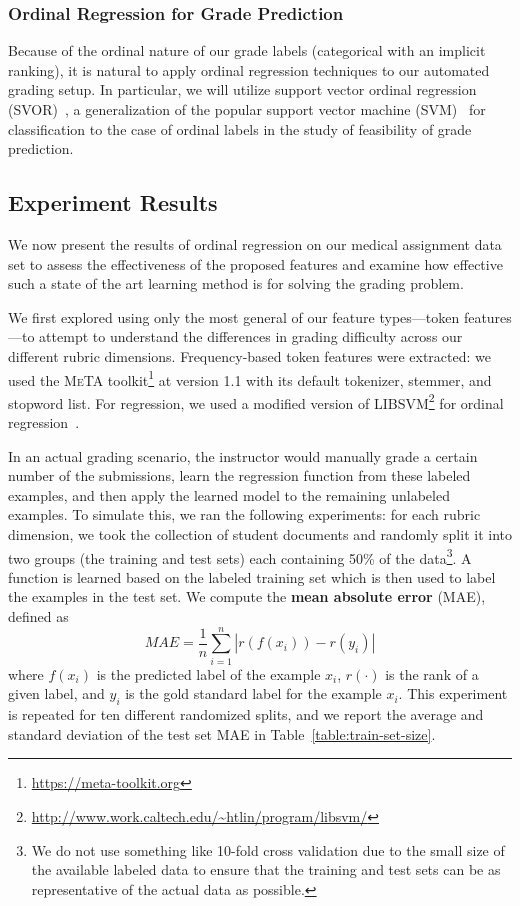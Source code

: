 \subsubsection{Ordinal Regression for Grade Prediction}

Because of the ordinal nature of our grade labels (categorical with an
implicit ranking), it is natural to apply ordinal regression techniques to
our automated grading setup. In particular, we will utilize support vector
ordinal regression (SVOR)~\cite{Chu:2007:SVOR}, a generalization of the
popular support vector machine (SVM)~\cite{Cortes:1995:SVM} for
classification to the case of ordinal labels in the study of feasibility of
grade prediction.

\subsection{Experiment Results}

We now present the results of ordinal regression on our medical assignment
data set to assess the effectiveness of the proposed features and examine
how effective such a state of the art learning method is for solving the
grading problem.

We first explored using only the most general of our feature types---token
features---to attempt to understand the differences in grading difficulty
across our different rubric dimensions. Frequency-based token features were
extracted: we used the \textsc{MeTA}
toolkit\footnote{\url{https://meta-toolkit.org}} at version 1.1
with its default tokenizer, stemmer, and stopword list. For regression, we
used a modified version of
\textsc{LIBSVM}\footnote{\url{http://www.work.caltech.edu/~htlin/program/libsvm/}}
for ordinal regression~\cite{Li:2007:NIPS}.

In an actual grading scenario, the instructor would manually grade a
certain number of the submissions, learn the regression function from these
labeled examples, and then apply the learned model to the remaining
unlabeled examples. To simulate this, we ran the following experiments: for
each rubric dimension, we took the collection of student documents and
randomly split it into two groups (the training and test sets) each
containing 50\% of the data\footnote{We do not use something like 10-fold
cross validation due to the small size of the available labeled data to
ensure that the training and test sets can be as representative of the
actual data as possible.}. A function is learned based on the labeled
training set which is then used to label the examples in the test set. We
compute the \textbf{mean absolute error} (MAE), defined as
\[
MAE = \frac{1}{n} \sum_{i=1}^n | r(f(x_i)) - r(y_i) |
\]
where $f(x_i)$ is the predicted label of the example $x_i$, $r(\cdot)$ is
the rank of a given label, and $y_i$ is the gold standard label for the
example $x_i$. This experiment is repeated for ten different randomized
splits, and we report the average and standard deviation of the test set
MAE in Table~\ref{table:train-set-size}.

